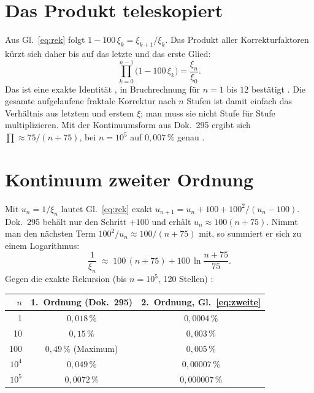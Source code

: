 \section{Das Produkt teleskopiert}

Aus Gl.~\eqref{eq:rek} folgt $1-100\,\xi_k=\xi_{k+1}/\xi_k$. Das Produkt aller
Korrekturfaktoren kürzt sich daher bis auf das letzte und das erste Glied:
\begin{equation}
  \prod_{k=0}^{n-1}\bigl(1-100\,\xi_k\bigr)=\frac{\xi_n}{\xi_0}. \label{eq:tele}
\end{equation}
Das ist eine exakte Identität \BM, in Bruchrechnung für $n=1$ bis $12$ bestätigt
\KM. Die gesamte aufgelaufene fraktale Korrektur nach $n$ Stufen ist damit einfach
das Verhältnis aus letztem und erstem $\xi$; man muss sie nicht Stufe für Stufe
multiplizieren. Mit der Kontinuumsform aus Dok.~295 ergibt sich
$\prod\approx75/(n+75)$, bei $n=10^5$ auf $0{,}007\,\%$ genau \KM.

\section{Kontinuum zweiter Ordnung}

Mit $u_n=1/\xi_n$ lautet Gl.~\eqref{eq:rek} exakt
$u_{n+1}=u_n+100+100^2/(u_n-100)$. Dok.~295 behält nur den Schritt $+100$ und
erhält $u_n\approx100(n+75)$. Nimmt man den nächsten Term $100^2/u_n\approx100/(n+75)$
mit, so summiert er sich zu einem Logarithmus:
\begin{equation}
  \frac{1}{\xi_n}\;\approx\;100\,(n+75)+100\,\ln\frac{n+75}{75}. \label{eq:zweite}
\end{equation}
Gegen die exakte Rekursion (bis $n=10^5$, 120 Stellen) \KM:

\begin{center}
\begin{tabular}{rcc}
\toprule
$n$ & 1.~Ordnung (Dok.~295) & 2.~Ordnung, Gl.~\eqref{eq:zweite} \\
\midrule
1 & $0{,}018\,\%$ & $0{,}0004\,\%$ \\
10 & $0{,}15\,\%$ & $0{,}003\,\%$ \\
100 & $0{,}49\,\%$ (Maximum) & $0{,}005\,\%$ \\
$10^4$ & $0{,}049\,\%$ & $0{,}00007\,\%$ \\
$10^5$ & $0{,}0072\,\%$ & $0{,}000007\,\%$ \\
\bottomrule
\end{tabular}
\end{center}

